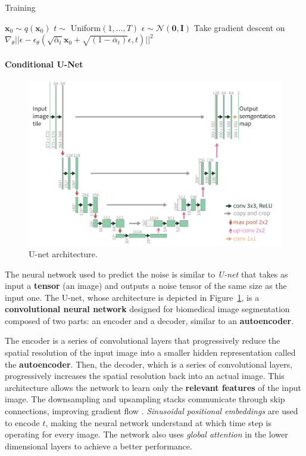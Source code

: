 \documentclass[preprint]{elsarticle}
\begin{document}
\begin{algorithm}[t]
    \caption{Training}\label{alg:training}
    \begin{algorithmic}[1]
    \Repeat
        \State $\mathbf{x}_0 \sim q(\mathbf{x}_0)$
        \State $t \sim$ Uniform$({1,\ldots,T})$
        \State $\epsilon \sim \mathcal{N}(\mathbf{0},\mathbf{I})$ 
        \State Take gradient descent on 
        $\nabla_\theta||\epsilon - \epsilon_\theta
	(\sqrt{\bar{\alpha}_t}\mathbf{x}_0 + \sqrt{(1-\bar{\alpha}_t)}\epsilon,t) ||^2$
    \end{algorithmic}
\end{algorithm}


\paragraph{Conditional U-Net}\mbox{}

\begin{figure}[t]
	\centering
    \includegraphics[scale=0.87]{img/svg/UNET.png}
	\caption{U-net architecture.}\label{fig:unet}
\end{figure}



The neural network used to predict the noise is similar to \emph{U-net} \cite{ronneberger2015unet} that takes as input a  \textbf{tensor} (an image) and outputs a noise tensor of the same size as the input one. The U-net, whose architecture is depicted in Figure~\ref{fig:unet}, is a \textbf{convolutional neural network} designed for biomedical image segmentation composed of two parts: an encoder and a decoder, similar to an \textbf{autoencoder}.

The encoder is a series of convolutional layers that progressively reduce the spatial resolution of the input image  into a smaller hidden representation called the \textbf{autoencoder}.
Then, the decoder, which is a series of convolutional layers, progressively increases the spatial resolution back into an actual image. This architecture allows the network to learn only the \textbf{relevant features} of the input image. The downsampling and upsampling stacks communicate through skip connections, improving gradient flow \cite{he2015deep}. \emph{Sinusoidal positional embeddings} are used to encode $t$,  making the neural network understand at which time step is operating for every image.
The network also uses \emph{global attention} in the lower dimensional layers to achieve a better performance.
\end{document}
